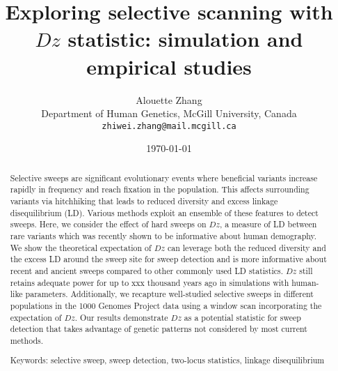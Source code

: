\documentclass[12pt]{article}
\title{Exploring selective scanning with $Dz$ statistic: simulation and empirical studies}
\author{Alouette Zhang \\ \small Department of Human Genetics, McGill University, Canada \\ \small \texttt{zhiwei.zhang@mail.mcgill.ca}}
\date{\today}
\begin{document}
\maketitle

\begin{abstract}
Selective sweeps are significant evolutionary events where beneficial variants increase rapidly in frequency and reach fixation in the population. This affects surrounding variants via hitchhiking that leads to reduced diversity and excess linkage disequilibrium (LD). Various methods exploit an ensemble of these features to detect sweeps. Here, we consider the effect of hard sweeps on $Dz$, a measure of LD between rare variants which was recently shown to be informative about human demography. 
We show the theoretical expectation of $Dz$ can leverage both the reduced diversity and the excess LD around the sweep site for sweep detection and is more informative about recent and ancient sweeps compared to other commonly used LD statistics. $Dz$ still retains adequate power for up to xxx thousand years ago in simulations with human-like parameters. Additionally, we recapture well-studied selective sweeps in different populations in the 1000 Genomes Project data using a window scan incorporating the expectation of $Dz$. Our results demonstrate $Dz$ as a potential statistic for sweep detection that takes advantage of genetic patterns not considered by most current methods. 

Keywords: selective sweep, sweep detection, two-locus statistics, linkage disequilibrium

\end{abstract}


\newpage
\tableofcontents
\newpage

\end{document}
